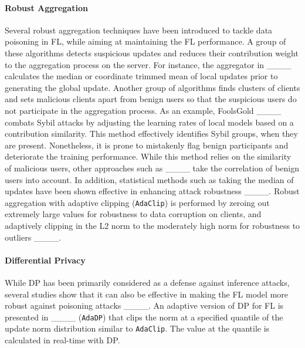 


\paragraph{Robust Aggregation}
Several robust aggregation techniques have been introduced to tackle data poisoning in FL, while aiming at maintaining the FL performance. A group of these algorithms detects suspicious updates and reduces their contribution weight to the aggregation process on the server. For instance, the aggregator in ____ calculates the median or coordinate trimmed mean of local updates prior to generating the global update. Another group of algorithms finds clusters of clients and sets malicious clients apart from benign users so that the suspicious users do not participate in the aggregation process. As an example, FoolsGold ____ combats Sybil attacks by adjusting the learning rates of local models based on a contribution similarity. This method effectively identifies Sybil groups, when they are present. Nonetheless, it is prone to mistakenly flag benign participants and deteriorate the training performance. While this method relies on the similarity of malicious users, other approaches such as ____ take the correlation of benign users into account. In addition, statistical methods such as taking the median of updates have been shown effective in enhancing attack robustness ____. Robust aggregation with adaptive clipping (\verb+AdaClip+) is performed by zeroing out extremely large values for robustness to data corruption on clients, and adaptively clipping in the L2 norm to the moderately high norm for robustness to outliers ____.

\paragraph{Differential Privacy}
While DP has been primarily considered as a defense against inference attacks, several studies show that it can also be effective in making the FL model more robust against poisoning attacks ____. An adaptive version of DP for FL is presented in ____ (\verb+AdaDP+) that clips the norm at a specified quantile of the update norm distribution similar to \verb+AdaClip+. The value at the quantile is calculated in real-time with DP.


